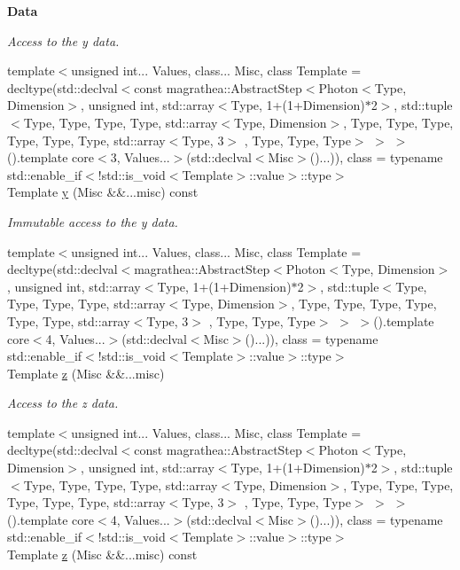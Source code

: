 \begin{Indent}{\bf Data}
\begin{DoxyCompactItemize}
\begin{DoxyCompactList}\small\item\em Access to the y data. \end{DoxyCompactList}\item 
{\footnotesize template$<$unsigned int... Values, class... Misc, class Template  = decltype(std\-::declval$<$const magrathea\-::\-Abstract\-Step$<$\-Photon$<$\-Type, Dimension$>$, unsigned int, std\-::array$<$\-Type, 1+(1+\-Dimension)$\ast$2$>$, std\-::tuple$<$\-Type, Type, Type, Type, std\-::array$<$\-Type, Dimension$>$, Type, Type, Type, Type, Type, Type, std\-::array$<$\-Type, 3$>$ , Type, Type, Type$>$ $>$ $>$().\-template core$<$3, Values...$>$(std\-::declval$<$\-Misc$>$()...)), class  = typename std\-::enable\-\_\-if$<$!std\-::is\-\_\-void$<$\-Template$>$\-::value$>$\-::type$>$ }\\Template \hyperlink{exceptionPhoton_a04fbcd9b5bda75954faaf1c340c71c78}{y} (Misc \&\&...misc) const 
\begin{DoxyCompactList}\small\item\em Immutable access to the y data. \end{DoxyCompactList}\item 
{\footnotesize template$<$unsigned int... Values, class... Misc, class Template  = decltype(std\-::declval$<$magrathea\-::\-Abstract\-Step$<$\-Photon$<$\-Type, Dimension$>$, unsigned int, std\-::array$<$\-Type, 1+(1+\-Dimension)$\ast$2$>$, std\-::tuple$<$\-Type, Type, Type, Type, std\-::array$<$\-Type, Dimension$>$, Type, Type, Type, Type, Type, Type, std\-::array$<$\-Type, 3$>$ , Type, Type, Type$>$ $>$ $>$().\-template core$<$4, Values...$>$(std\-::declval$<$\-Misc$>$()...)), class  = typename std\-::enable\-\_\-if$<$!std\-::is\-\_\-void$<$\-Template$>$\-::value$>$\-::type$>$ }\\Template \hyperlink{exceptionPhoton_a1b6b93d4c4713592eea2251ab4465138}{z} (Misc \&\&...misc)
\begin{DoxyCompactList}\small\item\em Access to the z data. \end{DoxyCompactList}\item 
{\footnotesize template$<$unsigned int... Values, class... Misc, class Template  = decltype(std\-::declval$<$const magrathea\-::\-Abstract\-Step$<$\-Photon$<$\-Type, Dimension$>$, unsigned int, std\-::array$<$\-Type, 1+(1+\-Dimension)$\ast$2$>$, std\-::tuple$<$\-Type, Type, Type, Type, std\-::array$<$\-Type, Dimension$>$, Type, Type, Type, Type, Type, Type, std\-::array$<$\-Type, 3$>$ , Type, Type, Type$>$ $>$ $>$().\-template core$<$4, Values...$>$(std\-::declval$<$\-Misc$>$()...)), class  = typename std\-::enable\-\_\-if$<$!std\-::is\-\_\-void$<$\-Template$>$\-::value$>$\-::type$>$ }\\Template \hyperlink{exceptionPhoton_a2e9cc817b327a926e88da72e37a89ef0}{z} (Misc \&\&...misc) const 

\end{DoxyCompactItemize}
\end{Indent}
